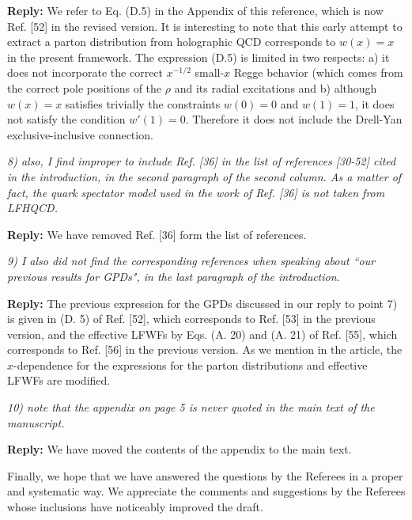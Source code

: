 \documentclass[12pt]{article}
\begin{document}
{\bf Reply:} We refer to Eq. (D.5) in the Appendix of this reference,  which is now Ref. [52] in the revised version. It is interesting to note that this early attempt to extract a parton distribution from holographic QCD corresponds to $w(x) = x$ in the present framework. The expression (D.5) is  limited in two respects: a) it does not incorporate the correct $x^{-1/2}$ small-$x$ Regge behavior (which comes from the correct pole positions of the $\rho$ and its radial excitations and b) although $w(x) = x$ satisfies trivially the constraints $w(0) = 0$ and $w(1) = 1$, it does not satisfy the condition $w'(1) = 0$. Therefore it does not include the Drell-Yan exclusive-inclusive connection.


{\it 8) also, I find improper to include Ref. [36] in the list of
references [30-52] cited in the introduction, in the second paragraph
of the second column. As a matter of fact, the quark spectator model
used in the work of Ref. [36] is not taken from LFHQCD.}

{\bf Reply:} We have removed Ref. [36] form the list of references.


{\it 9) I also did not find the corresponding references when speaking
about ``our previous results for GPDs", in the last paragraph of the
introduction.}

{\bf Reply:} The previous expression for the GPDs discussed in our reply to  point 7) is given in (D. 5) of Ref. [52], which corresponds to Ref. [53] in  the previous version, and the effective LFWFs by Eqs. (A. 20) and (A. 21) of  Ref. [55], which corresponds to Ref. [56] in  the previous version. As we mention in the article, the $x$-dependence for the expressions for the parton distributions and effective LFWFs are  modified.

{\it 10) note that the appendix on page 5 is never quoted in the main text
of the manuscript.}

{\bf Reply:} We have moved the contents of the appendix to the main text.

Finally, we hope that we have answered the questions by the Referees in a proper and systematic way. We appreciate the comments and suggestions by the Referees whose inclusions have noticeably improved the draft.
\end{document}
